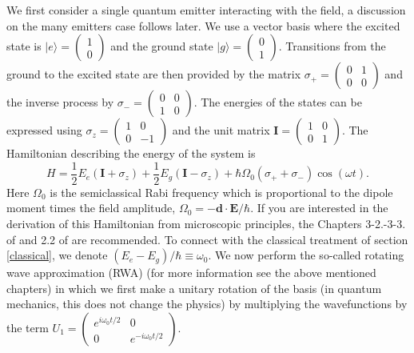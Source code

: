 \documentclass[12pt]{iopart}
\begin{document}
We first consider a single quantum emitter interacting with the field, a discussion on the many emitters case follows later. We use a vector basis where the excited state is $|e\rangle=\left(\begin{array}{c}
1\\ 0\end{array}\right)$ and the ground state $|g\rangle=\left(\begin{array}{c}
0\\ 1\end{array}\right)$. Transitions from the ground to the
excited state are then provided by the matrix $\sigma_+ = \left(\begin{array}{cc}
0 & 1\\
0 & 0\end{array}\right)$ and the inverse process by
$\sigma_- = \left(\begin{array}{cc}
0 & 0\\
1 & 0\end{array}\right)$. The energies of the states can be expressed using $\sigma_z = \left(\begin{array}{cc}
1 & 0\\
0 & - 1\end{array}\right)$
and the unit matrix $\mathbf{I} = \left(\begin{array}{cc}
1 & 0\\
0 & 1\end{array}\right)$. The Hamiltonian describing the energy of the system is
\begin{equation}
H = \frac{1}{2} E_e (\mathbf{I} + \sigma_z) + \frac{1}{2} E_g (\mathbf{I} - \sigma_z) + \hbar \Omega_0 (\sigma_+ + \sigma_-) \cos
(\omega t) .    
\end{equation} 
Here $\Omega_0$ is the semiclassical Rabi frequency which is proportional to the dipole moment times the field
amplitude, $\Omega_0 = - \mathbf{d}\cdot\mathbf{E}/\hbar$.
If you are interested in the derivation of this Hamiltonian from microscopic principles, the Chapters 3-2.-3-3. of 
\cite{Meystre91} and 2.2 of \cite{Grynberg10} are recommended. To connect with the classical treatment of section \ref{classical},
we denote $(E_e-E_g)/\hbar \equiv \omega_0$. We now perform the so-called rotating 
wave approximation (RWA) (for more information see the above mentioned chapters) in which we first make
a unitary rotation of the basis (in quantum mechanics, this does not change the physics)
by multiplying the wavefunctions by the term $U_1 = \left(\begin{array}{cc}
e^{i\omega_0 t/2} & 0\\
0 & e^{-i\omega_0 t/2} \end{array}\right)$.
\end{document}
